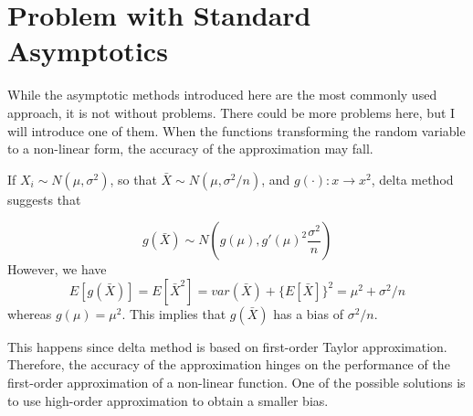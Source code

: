 \section{Problem with Standard Asymptotics}
While the asymptotic methods introduced here are the most commonly used approach, it is not without problems. There could be more problems here, but I will introduce one of them. When the functions transforming the random variable to a non-linear form, the accuracy of the approximation may fall.\par
\begin{mdframed}[backgroundcolor=yellow!5] 
\begin{example}
If $X_i\sim N(\mu, \sigma^2)$, so that $\bar{X}\sim N(\mu,\sigma^2/n)$, and $g(\cdot):x\to x^2$, delta method suggests that

\[
g(\bar{X})\sim N\left(g(\mu),g'(\mu)^2\frac{\sigma^2}{n}\right)
\]  However, we have
\[
E[g(\bar{X})]=E[\bar{X}^2]=var({\bar{X}})+\{E[\bar{X}]\}^2=\mu^2+\sigma^2/n
\]
whereas $g(\mu)=\mu^2$. This implies that $g(\bar{X})$ has a bias of $\sigma^2/n$.
\end{example}
\end{mdframed}\par
This happens since delta method is based on first-order Taylor approximation. Therefore, the accuracy of the approximation hinges on the performance of the first-order approximation of a non-linear function. One of the possible solutions is to use high-order approximation to obtain a smaller bias.



